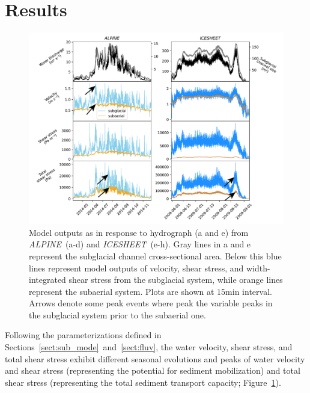 \documentclass[11pt]{article}
\newcommand{\alpine}{\textit{ALPINE}\,}
\newcommand{\icesheet}{\textit{ICESHEET}\,}
\newcommand{\unit}[1]{$\mathrm{#1}$}
\begin{document}
\section{Results}

\begin{center}
  \begin{figure}[h]
    \includegraphics[width=0.8\linewidth]{Fig2.pdf}
    \caption{Model outputs as in response to hydrograph (a and e) from \alpine{} (a-d) and \icesheet{} (e-h). Gray lines in a and e represent the subglacial channel cross-sectional area. Below this blue lines represent model outputs of velocity, shear stress, and width-integrated shear stress from the subglacial system, while orange lines represent the subaerial system.
      Plots are shown at $15$\unit{min} interval.
    Arrows denote some peak events where peak the variable peaks in the subglacial system prior to the subaerial one.} 
    \label{fig:model_outs}
  \end{figure}
\end{center}

Following the parameterizations defined in Sections~\ref{sect:sub_mode}~and~\ref{sect:fluv}, the water velocity, shear stress, and total shear stress exhibit different seasonal evolutions and peaks of water velocity and shear stress (representing the potential for sediment mobilization) and total shear stress (representing the total sediment transport capacity; Figure~\ref{fig:model_outs}).
\end{document}
